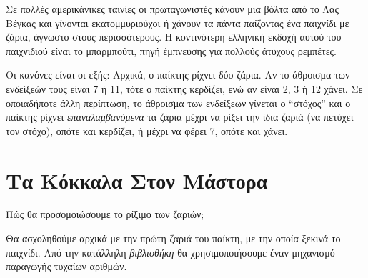\documentclass[a4paper,11pt,oneside]{book}
\begin{document}

Σε πολλές αμερικάνικες ταινίες οι πρωταγωνιστές κάνουν μια βόλτα από το Λας Βέγκας και γίνονται εκατομμυριούχοι ή χάνουν τα πάντα παίζοντας ένα παιχνίδι με ζάρια, άγνωστο στους περισσότερους. Η κοντινότερη ελληνική εκδοχή αυτού του παιχνιδιού είναι το μπαρμπούτι, πηγή έμπνευσης για πολλούς άτυχους ρεμπέτες.

Οι κανόνες είναι οι εξής: Αρχικά, ο παίκτης ρίχνει δύο ζάρια. Αν το άθροισμα των ενδείξεών τους είναι 7 ή 11, τότε ο παίκτης κερδίζει, ενώ αν είναι 2, 3 ή 12 χάνει. Σε οποιαδήποτε άλλη περίπτωση, το άθροισμα των ενδείξεων γίνεται ο ``στόχος'' και ο παίκτης ρίχνει \emph{επαναλαμβανόμενα} τα ζάρια μέχρι να ρίξει την ίδια ζαριά (να πετύχει τον στόχο), οπότε και κερδίζει, ή μέχρι να φέρει 7, οπότε και χάνει.


\section{Τα Κόκκαλα Στον Μάστορα}

\begin{question}
Πώς θα προσομοιώσουμε το ρίξιμο των ζαριών;
\end{question}

Θα ασχοληθούμε αρχικά με την πρώτη ζαριά του παίκτη, με την οποία ξεκινά το παιχνίδι. Από την κατάλληλη \emph{βιβλιοθήκη} %
θα χρησιμοποιήσουμε έναν μηχανισμό παραγωγής τυχαίων αριθμών.
\end{document}

